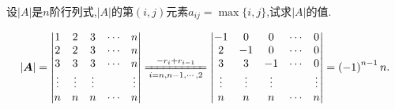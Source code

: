 \documentclass[../../main.tex]{subfiles}%
\begin{document}
\begin{example}
设\(\vert A\vert\)是\(n\)阶行列式,\(\vert A\vert\)的第\((i,j)\)元素\(a_{ij}=\max\{i,j\}\),试求\(\vert A\vert\)的值.
\end{example}
\begin{solution}

\begin{align*}
\left| \boldsymbol{A} \right|=\left| \begin{matrix}
1&		2&		3&		\cdots&		n\\
2&		2&		3&		\cdots&		n\\
3&		3&		3&		\cdots&		n\\
\vdots&		\vdots&		\vdots&		&		\vdots\\
n&		n&		n&		\cdots&		n\\
\end{matrix} \right|\xlongequal[i=n,n-1,\cdots ,2]{-r_i+r_{i-1}}\left| \begin{matrix}
-1&		0&		0&		\cdots&		0\\
2&		-1&		0&		\cdots&		0\\
3&		3&		-1&		\cdots&		0\\
\vdots&		\vdots&		\vdots&		&		\vdots\\
n&		n&		n&		\cdots&		n\\
\end{matrix} \right|=\left( -1 \right) ^{n-1}n.
\end{align*}

\end{solution}
\end{document}
